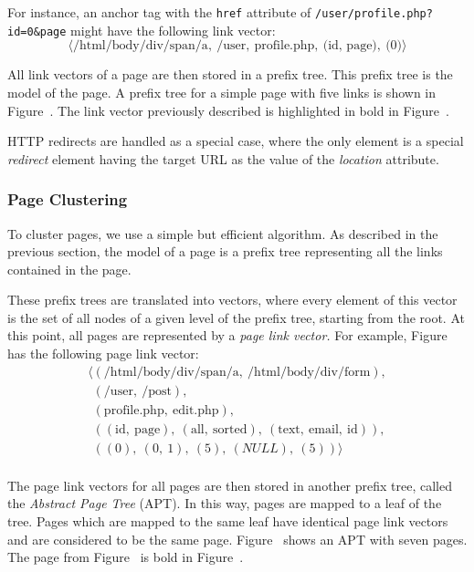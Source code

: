 \noindent{}For instance, an anchor tag with the \texttt{href} attribute of
\texttt{/user/profile.php?id=0\&page} might have the following link vector:%
\[\langle{}\text{/html/body/div/span/a},\ \text{/user},\ \text{profile.php},\ \text{(id,
  page)},\ \text{(0)}\rangle{}\] 

All link vectors of a page are then stored in a prefix tree. This prefix tree
is the model of the page. A prefix tree for a simple page with five links is
shown in Figure~. The link vector previously described is
highlighted in bold in Figure~.

HTTP redirects are handled as a special case, where the only element is a
special \emph{redirect} element having the target URL as the value of the
\emph{location} attribute.

\subsubsection{Page Clustering}

To cluster pages, we use a simple but efficient algorithm. As described in the
previous section, the model of a page is a prefix tree representing all the links
contained in the page.

These prefix trees are translated into vectors, where every element of this
vector is the set of all nodes of a given level of the prefix tree, starting
from the root. At this point, all pages are represented by a \emph{page link
  vector.} For example, Figure~ has the following page
link vector:
\[
\begin{array}{l}
\langle{}(\text{/html/body/div/span/a},\ \text{/html/body/div/form}), \\
\phantom{\langle{}}(\text{/user},\ \text{/post}), \\
\phantom{\langle{}}(\text{profile.php},\ \text{edit.php}), \\
\phantom{\langle{}}((\text{id},\ \text{page}),\ (\text{all},\ \text{sorted}),\ (\text{text},\ \text{email},\ \text{id})), \\
\phantom{\langle{}}((0),\ (0,\ 1),\ (5),\ (NULL),\ (5))\rangle{} \\
\end{array}
\]

The page link vectors for all pages are then stored in another prefix tree, called the
\emph{Abstract Page Tree} (APT). In this way, pages are mapped to a leaf of the
tree. Pages which are mapped to the same leaf have identical page link vectors
and are considered to be the same page. Figure~ shows
an APT with seven pages. The page from Figure~ is bold in
Figure~. 

